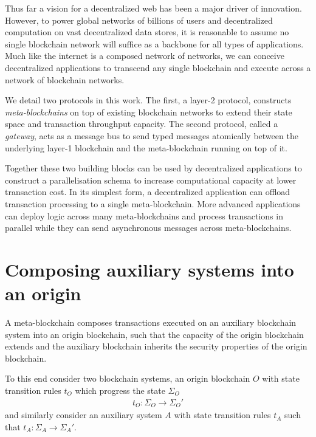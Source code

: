 \documentclass[12pt,a4paper]{article}
\begin{document}

Thus far a vision for a decentralized web has been a major driver of innovation.
However, to power global networks of billions of users and decentralized computation on vast decentralized data stores, it is reasonable to assume no single blockchain network will suffice as a backbone for all types of applications.
Much like the internet is a composed network of networks, we can conceive decentralized applications to transcend any single blockchain and execute across a network of blockchain networks.

We detail two protocols in this work.
The first, a layer-2 protocol, constructs \emph{meta-blockchains} on top of existing blockchain networks to extend their state space and transaction throughput capacity.
The second protocol, called a \emph{gateway}, acts as a message bus to send typed messages atomically between the underlying layer-1 blockchain and the meta-blockchain running on top of it.

Together these two building blocks can be used by decentralized applications to construct a parallelisation schema to increase %
computational capacity at lower transaction cost.
In its simplest form, a decentralized application can offload transaction processing to a single meta-blockchain.
More advanced applications can deploy logic across many meta-blockchains and process transactions in parallel while they can send asynchronous messages across meta-blockchains.



\section{Composing auxiliary systems into an origin}

A meta-blockchain composes transactions executed on an auxiliary blockchain system into an origin blockchain, such that the capacity of the origin blockchain extends and the auxiliary blockchain inherits the security properties of the origin blockchain.

To this end consider two blockchain systems, an origin blockchain $O$ with state transition rules $t_O$ which progress the state $\Sigma_O$ 
\begin{align} \label{state_transition_rules}
  t_O : \Sigma_O \rightarrow \Sigma_O'
\end{align}
and similarly consider an auxiliary system $A$ with state transition rules $t_A$ such that $t_A : \Sigma_A \rightarrow \Sigma_A'$.
\end{document}
